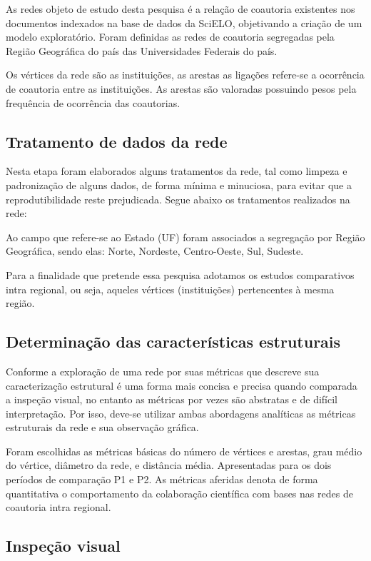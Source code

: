 \documentclass[12pt]{article}
\begin{document}
As redes objeto de estudo desta pesquisa é a relação de coautoria existentes nos documentos indexados na base de dados da SciELO, objetivando a criação de um modelo exploratório. Foram definidas as redes de coautoria segregadas pela Região Geográfica do país das Universidades Federais do país.

Os vértices da rede são as instituições, as arestas as ligações refere-se a ocorrência de coautoria entre as instituições. As arestas são valoradas possuindo pesos pela frequência de ocorrência das coautorias.


\subsection{Tratamento de dados da rede}

Nesta etapa foram elaborados alguns tratamentos da rede, tal como limpeza e padronização de alguns dados, de forma mínima e minuciosa, para evitar que a reprodutibilidade reste prejudicada. Segue abaixo os tratamentos realizados na rede:

Ao campo que refere-se ao Estado (UF) foram associados a segregação por Região Geográfica, sendo elas: Norte, Nordeste, Centro-Oeste, Sul, Sudeste. 

Para a finalidade que pretende essa pesquisa adotamos os estudos comparativos intra regional, ou seja, aqueles vértices (instituições) pertencentes à mesma região.

\subsection{Determinação das características estruturais}

Conforme \cite{de2018exploratory} a exploração de uma rede por suas métricas que descreve sua caracterização estrutural é uma forma mais concisa e precisa quando comparada a inspeção visual, no entanto as métricas por vezes são abstratas e de difícil interpretação. Por isso, deve-se utilizar ambas abordagens analíticas as métricas estruturais da rede e sua observação gráfica.

Foram escolhidas as métricas básicas do número de vértices e arestas, grau médio do vértice, diâmetro da rede, e distância média. Apresentadas para os dois períodos de comparação P1 e P2. As métricas aferidas denota de forma quantitativa o comportamento da colaboração científica com bases nas redes de coautoria intra regional.

\subsection{Inspeção visual}
\end{document}
